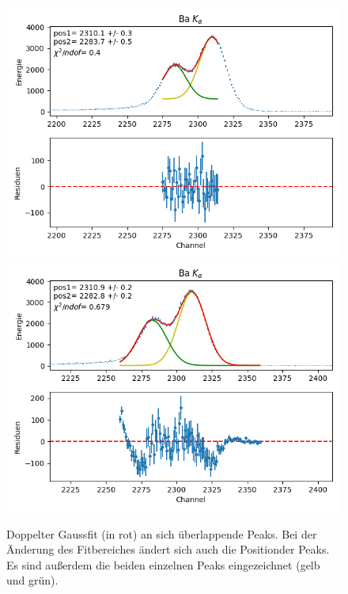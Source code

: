 \documentclass[12pt,a4paper]{article}
\begin{document}
\begin{figure}
\centering
\includegraphics[scale=0.8]{Bilder/alpha/ba_alpha_1.png}
\includegraphics[scale=0.8]{Bilder/alpha/ba_alpha_2.png}
\caption{Doppelter Gaussfit (in rot) an sich überlappende Peaks. Bei der Änderung des Fitbereiches ändert sich auch die Positionder Peaks. Es sind außerdem die beiden einzelnen Peaks eingezeichnet (gelb und grün).}
\label{fig:kal_fein}
\end{figure}
\end{document}
